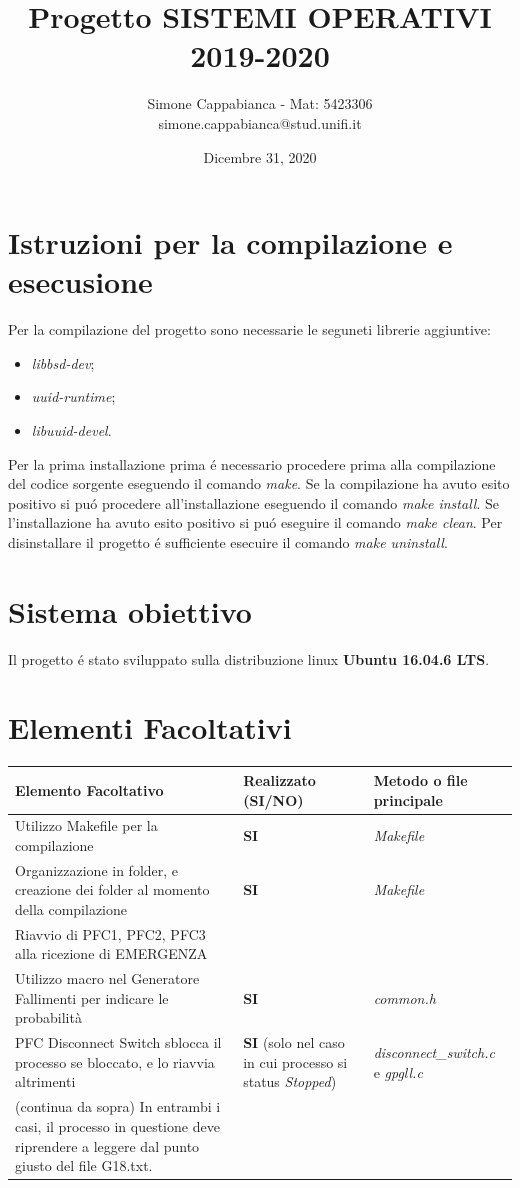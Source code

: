 \documentclass[11pt, oneside]{article}   	%
\title{Progetto SISTEMI OPERATIVI 2019-2020}
\author{Simone Cappabianca - Mat: 5423306 \\  simone.cappabianca@stud.unifi.it}
\date{Dicembre 31, 2020}							%
\begin{document}
\maketitle
\newpage

\tableofcontents
\newpage

\section{Istruzioni per la compilazione e esecusione}
Per la compilazione del progetto sono necessarie le seguneti librerie aggiuntive:
\begin{itemize}
	\item \textit{libbsd-dev};
	\item \textit{uuid-runtime};
	\item \textit{libuuid-devel}.
\end{itemize} 

Per la prima installazione prima \'e necessario procedere prima alla compilazione del codice sorgente eseguendo il comando \textit{make}. Se la compilazione ha avuto esito positivo si pu\'o procedere all'installazione eseguendo il comando \textit{make install}. Se l'installazione ha avuto esito positivo si pu\'o eseguire il comando \textit{make clean}. Per disinstallare il progetto \'e sufficiente esecuire il comando \textit{make uninstall}. \par

\section{Sistema obiettivo}
Il progetto \'e stato sviluppato sulla distribuzione linux \textbf{Ubuntu 16.04.6 LTS}.

\section{Elementi Facoltativi}
\begin{tabular}{|p{}|p{}|p{}|}
	\hline 
	\textbf{Elemento Facoltativo} & \textbf{Realizzato (SI/NO)} & \textbf{Metodo o file principale}\\
	\hline
	Utilizzo Makefile per la compilazione & \textbf{SI} & \textit{Makefile}\\
	\hline
	Organizzazione in folder, e creazione dei folder al momento della compilazione & \textbf{SI} & \textit{Makefile} \\
	\hline
	Riavvio di PFC1, PFC2, PFC3 alla ricezione di EMERGENZA &  & \\
	\hline
	Utilizzo macro nel Generatore Fallimenti per indicare le probabilità & \textbf{SI} & \textit{common.h} \\
	\hline
	PFC Disconnect Switch sblocca il processo se bloccato, e lo riavvia altrimenti & \textbf{SI} (solo nel caso in cui processo si status \textit{Stopped}) & \textit{disconnect\_switch.c} e \textit{gpgll.c}\\
	\hline
	(continua da sopra) In entrambi i casi, il processo in questione deve riprendere a leggere dal punto giusto del file G18.txt. & & \\
	\hline
\end{tabular}
\end{document}
